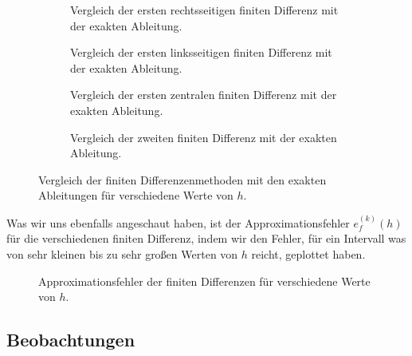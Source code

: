 \documentclass{scrartcl}
\theoremstyle{remark}
\begin{document}
\begin{figure}[h]
    \centering
    \begin{subfigure}{0.45\textwidth}
        
        \caption{Vergleich der ersten rechtsseitigen finiten Differenz mit der exakten Ableitung.}
        \label{fig:first-right} %
    \end{subfigure}
    \begin{subfigure}{0.45\textwidth}
        
        \caption{Vergleich der ersten linksseitigen finiten Differenz mit der exakten Ableitung.}
        \label{fig:first-left} %
    \end{subfigure}
    \begin{subfigure}{0.45\textwidth}
        
        \caption{Vergleich der ersten zentralen finiten Differenz mit der exakten Ableitung.}
        \label{fig:first-central} %
    \end{subfigure}
    \begin{subfigure}{0.45\textwidth}
        
        \caption{Vergleich der zweiten finiten Differenz mit der exakten Ableitung.}
        \label{fig:second} %
    \end{subfigure}
    \caption{Vergleich der finiten Differenzenmethoden mit den exakten Ableitungen für verschiedene Werte von \(h\).}
    \label{fig:finite-differences} %
\end{figure}

\pagebreak

Was wir uns ebenfalls angeschaut haben, ist der Approximationsfehler
\(e_{f}^{(k)}(h)\) für die verschiedenen finiten Differenz, indem wir den
Fehler, für ein Intervall was von sehr kleinen bis zu sehr großen Werten von
\(h\) reicht, geplottet haben.

\begin{figure}[h]
    \centering
    
    \caption{Approximationsfehler der finiten Differenzen für verschiedene Werte von \(h\).}
    \label{fig:errors} %
\end{figure}

\subsection{Beobachtungen}
\end{document}
